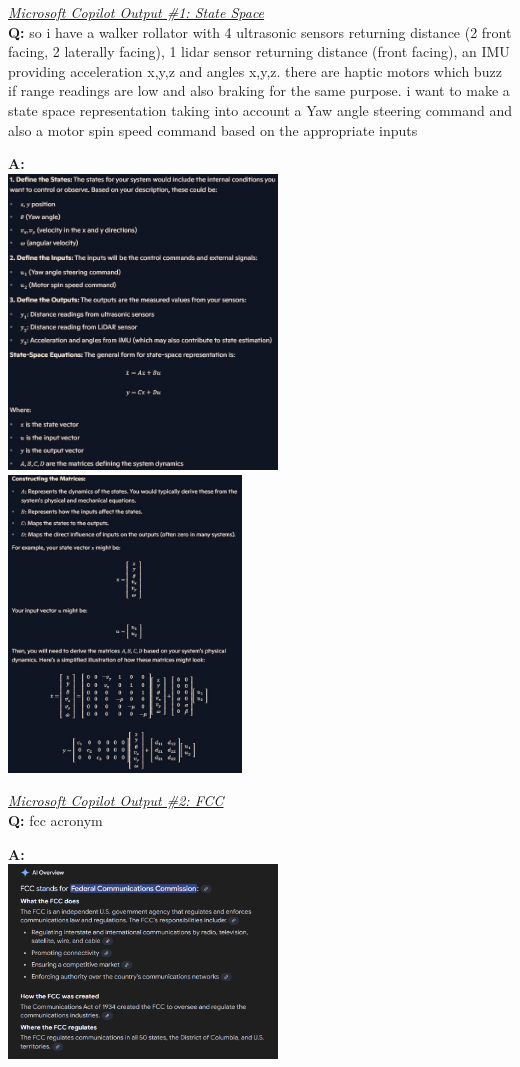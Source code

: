 \underline{\textit{Microsoft Copilot Output \#1: State Space}}\\

\noindent \textbf{Q:} so i have a walker rollator with 4 ultrasonic sensors returning distance (2 front facing, 2 laterally facing), 1 lidar sensor returning distance (front facing), an IMU providing acceleration x,y,z and angles x,y,z. there are haptic motors which buzz if range readings are low and also braking for the same purpose. i want to make a state space representation taking into account a Yaw angle steering command and also a motor spin speed command based on the appropriate inputs

\noindent \textbf{A:} \\
\includegraphics[width=0.535\textwidth]{./Images/copilot-ssr.JPG}
\includegraphics[width=0.465\textwidth]{./Images/copilot-ssr2.JPG}

\underline{\textit{Microsoft Copilot Output \#2: FCC}}\\

\noindent \textbf{Q:} fcc acronym

\noindent \textbf{A:} \\
\includegraphics[width=0.535\textwidth]{./Images/fcc_ai.png}
